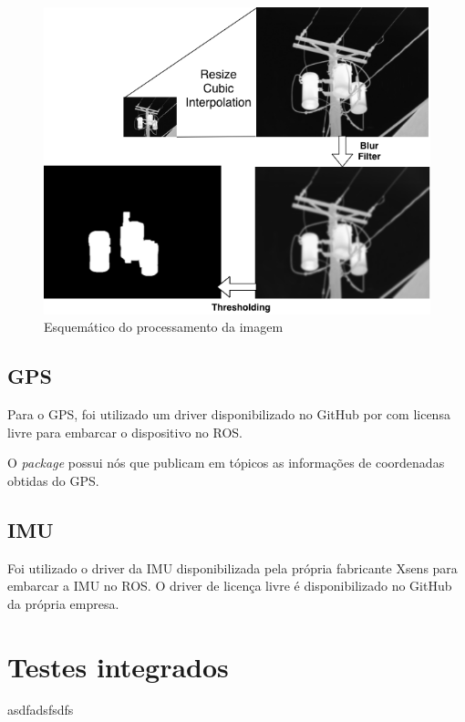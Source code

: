     \begin{figure}[!ht]
    	\centering
    	\includegraphics[width=14cm]{Figures/image_proc.png}
    	\caption{Esquemático do processamento da imagem} \label{imgproc}
	\end{figure}
     
     \subsection{GPS}
     
     Para o GPS, foi utilizado um driver disponibilizado no GitHub por  com licensa livre para embarcar o dispositivo no ROS.
     
     O \textit{package} possui nós que publicam em tópicos as informações de coordenadas obtidas do GPS.
     
     \subsection{IMU}
    Foi utilizado o driver da IMU disponibilizada pela própria fabricante Xsens para embarcar a IMU no ROS. O driver de licença livre é disponibilizado no GitHub da própria empresa.
\section{Testes integrados}
\label{sec:testi}
asdfadsfsdfs

